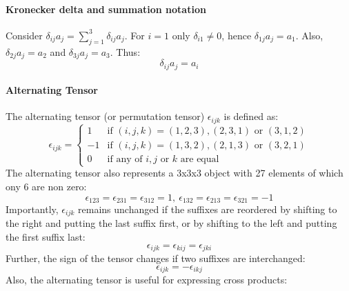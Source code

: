 \documentclass[11pt]{article}
\begin{document}
    \paragraph{Kronecker delta and summation notation}
    Consider $\delta_{ij} a_j = \sum_{j = 1}^{3} \delta_{ij} a_j$.
    For $i = 1$ only $\delta_{i1} \neq 0$, hence $\delta_{1j} a_j = a_1$.
    Also, $\delta_{2j} a_j = a_2$ and $\delta_{3j} a_j = a_3$.
    Thus:\\
    \begin{equation}
        \label{eq:equation16}
        \delta_{ij} a_j = a_i
    \end{equation}
    \paragraph{Alternating Tensor}
    The alternating tensor (or permutation tensor) $\epsilon_{ijk}$ is defined as:
    \begin{equation}
        \label{eq:equation17}
        \epsilon_{ijk} =
        \begin{cases}
            1 & \text{if $(i,j,k) = (1,2,3),(2,3,1)$ or $(3,1,2)$}\\
            -1 & \text{if $(i,j,k) = (1,3,2), (2,1,3)$ or $(3,2,1)$}\\
            0 & \text{if any of $i,j$ or $k$ are equal}
        \end{cases}
    \end{equation}
    The alternating tensor also represents a 3x3x3 object with 27 elements of which ony 6 are non zero:
    \begin{equation}
        \label{eq:equation18}
        \epsilon_{123} = \epsilon_{231} = \epsilon_{312} = 1, \:
        \epsilon_{132} = \epsilon_{213} = \epsilon_{321} = -1
    \end{equation}
    Importantly, $\epsilon_{ijk}$ remains unchanged if the suffixes are reordered by shifting to the right and putting the last
    suffix first, or by shifting to the left and putting the first suffix last:
    \begin{equation}
        \label{eq:equation19}
        \epsilon_{ijk} = \epsilon_{kij} = \epsilon_{jki}
    \end{equation}
    Further, the sign of the tensor changes if two suffixes are interchanged:
    \begin{equation}
        \label{eq:equation20}
        \epsilon_{ijk} = -\epsilon_{ikj}
    \end{equation}
    Also, the alternating tensor is useful for expressing cross products:
\end{document}

